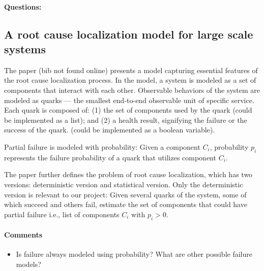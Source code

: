 \documentclass{article}
\begin{document}
\paragraph{Questions:}


\subsection{A root cause localization model for large scale systems}
\label{sec:rootcause}

The paper (bib not found online) presents a model capturing essential features of the root cause
localization process. In the model, a system is modeled as a set of components
that interact with each other. Observable behaviors of the system are modeled as
quarks --- the smallest end-to-end observable unit of specific service. Each
quark is composed of:
(1) the set of components used by the quark (could be implemented as a list); and
(2) a health result, signifying the failure or the success of the quark. (could
be implemented as a boolean variable).

Partial failure is modeled with probability: Given a component $C_i$,
probability $p_i$ represents the failure probability of a quark that utilizes
component $C_i$.

The paper further defines the problem of root cause localization, which has two
versions: deterministic version and statistical version. Only the deterministic
version is relevant to our project: Given several quarks of the system, some of
which succeed and others fail, estimate the set of components that could have partial
failure i.e., list of components $C_i$ with $p_i > 0$.

\paragraph{Comments}

\begin{itemize}
\item Is failure always modeled using probability? What are other possible
  failure models?
\end{itemize}



{}

\end{document}
